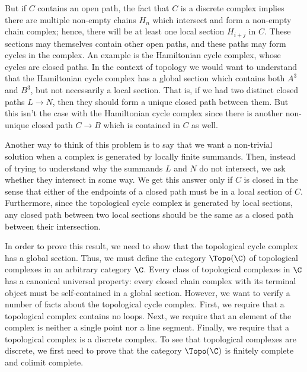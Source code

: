 \documentclass[a4paper,reqno,oneside]{article}
\begin{document}
But if $C$ contains an open path, the fact that $C$ is a discrete complex implies there are multiple non-empty chains $H_n$ which intersect and form a non-empty chain complex; hence, there will be at least one local section $H_{i+j}$ in $C$.  These sections may themselves contain other open paths, and these paths may form cycles in the complex.  An example is the Hamiltonian cycle complex, whose cycles are closed paths.   In the context of topology we would want to understand that the Hamiltonian cycle complex has a global section which contains both $A^3$ and $B^3$, but not necessarily a local section.  That is, if we had two distinct closed paths $L \to N$, then they should form a unique closed path between them.  But this isn't the case with the Hamiltonian cycle complex since there is another non-unique closed path $C \to B$ which is contained in $C$ as well. 

Another way to think of this problem is to say that we want a non-trivial solution when a complex is generated by locally finite summands.  Then, instead of trying to understand why the summands $L$ and $N$ do not intersect, we ask whether they intersect in some way.  We get this answer only if $C$ is closed in the sense that either of the endpoints of a closed path must be in a local section of $C$.  Furthermore, since the topological cycle complex is generated by local sections, any closed path between two local sections should be the same as a closed path between their intersection.   

In order to prove this result, we need to show that the topological cycle complex has a global section.  Thus, we must define the category $\Topo(\C)$ of topological complexes in an arbitrary category $\C$.  Every class of topological complexes in $\C$ has a canonical universal property: every closed chain complex with its terminal object must be self-contained in a global section.  However, we want to verify a number of facts about the topological cycle complex.  First, we require that a topological complex contains no loops.  Next, we require that an element of the complex is neither a single point nor a line segment.  Finally, we require that a topological complex is a discrete complex.  To see that topological complexes are discrete, we first need to prove that the category $\Topo(\C)$ is finitely complete and colimit complete.  
\end{document}
